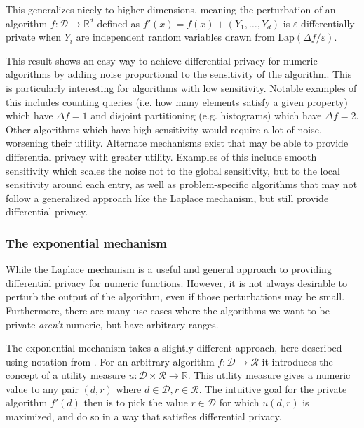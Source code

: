 \documentclass[12pt]{article}
\newcommand{\fancy}{\mathcal}
\renewcommand{\epsilon}{\varepsilon}
\begin{document}
This generalizes nicely to higher dimensions, meaning the perturbation of an algorithm $f : \fancy{D} \to \mathbb{R}^d$ defined as $f'(x) = f(x) + (Y_1,\dots,Y_d)$ is $\epsilon$-differentially private when $Y_i$ are independent random variables drawn from $\text{Lap}(\Delta f / \epsilon)$. \bigskip

This result shows an easy way to achieve differential privacy for numeric algorithms by adding noise proportional to the sensitivity of the algorithm. This is particularly interesting for algorithms with low sensitivity. Notable examples of this includes counting queries (i.e. how many elements satisfy a given property) which have $\Delta f=1$ and disjoint partitioning (e.g. histograms) which have $\Delta f=2$. Other algorithms which have high sensitivity would require a lot of noise, worsening their utility. Alternate mechanisms exist that may be able to provide differential privacy with greater utility. Examples of this include smooth sensitivity \cite{nissim_smoothsens} which scales the noise not to the global sensitivity, but to the local sensitivity around each entry, as well as problem-specific algorithms that may not follow a generalized approach like the Laplace mechanism, but still provide differential privacy.

\subsubsection{The exponential mechanism}

While the Laplace mechanism is a useful and general approach to providing differential privacy for numeric functions. However, it is not always desirable to perturb the output of the algorithm, even if those perturbations may be small. Furthermore, there are many use cases where the algorithms we want to be private \emph{aren't} numeric, but have arbitrary ranges.

The exponential mechanism \cite{sherry_exponentialmech} takes a slightly different approach, here described using notation from \cite{dwork_privacybook}. For an arbitrary algorithm $f : \fancy{D} \to \fancy{R}$ it introduces the concept of a utility measure $u : \fancy{D} \times \fancy{R} \to \mathbb{R}$. This utility measure gives a numeric value to any pair $(d,r)$ where $d \in \fancy{D}, r \in \fancy{R}$. The intuitive goal for the private algorithm $f'(d)$ then is to pick the value $r \in \fancy{D}$ for which $u(d,r)$ is maximized, and do so in a way that satisfies differential privacy.
\end{document}
